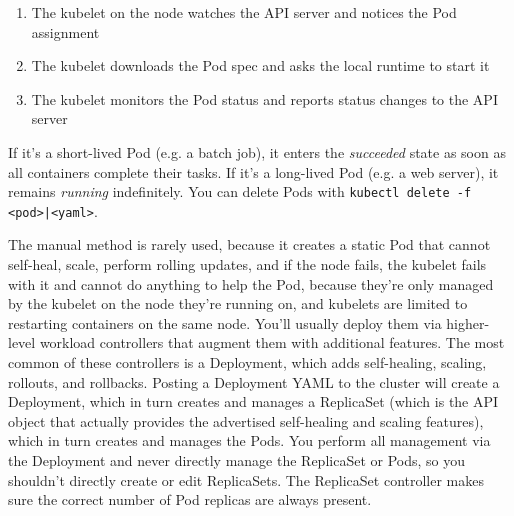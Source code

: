 \documentclass[table, xcdraw]{article}%
\begin{document}
\begin{enumerate}
\begin{itemize}
		\item etc.
    \end{itemize}
    The Pod is assigned to a healthy node meeting all requirements. (If the scheduler can’t find a suitable node, it marks it as pending.)
    \item The kubelet on the node watches the API server and notices the Pod assignment
    \item The kubelet downloads the Pod spec and asks the local runtime to start it
    \item The kubelet monitors the Pod status and reports status changes to the API server
\end{enumerate}

If it’s a short-lived Pod (e.g. a batch job), it enters the \emph{succeeded} state as soon as all containers complete their tasks. If it’s a long-lived Pod (e.g. a web server), it remains \emph{running} indefinitely. You can delete Pods with \texttt{kubectl delete -f <pod>|<yaml>}.

The manual method is rarely used, because it creates a static Pod that cannot self-heal, scale, perform rolling updates, and if the node fails, the kubelet fails with it and cannot do anything to help the Pod, because they’re only managed by the kubelet on the node they’re running on, and kubelets are limited to restarting containers on the same node. You’ll usually deploy them via higher-level workload controllers that augment them with additional features. The most common of these controllers is a Deployment, which adds self-healing, scaling, rollouts, and rollbacks. Posting a Deployment YAML to the cluster will create a Deployment, which in turn creates and manages a ReplicaSet (which is the API object that actually provides the advertised self-healing and scaling features), which in turn creates and manages the Pods. You perform all management via the Deployment and never directly manage the ReplicaSet or Pods, so you shouldn’t directly create or edit ReplicaSets. The ReplicaSet controller makes sure the correct number of Pod replicas are always present.
\end{document}
